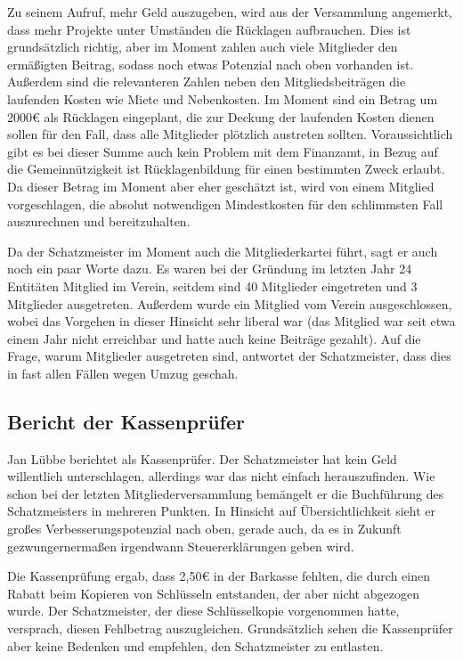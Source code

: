 \documentclass[a4paper,12pt]{scrartcl}
\begin{document}
Zu seinem Aufruf, mehr Geld auszugeben, wird aus der Versammlung angemerkt,
dass mehr Projekte unter Umständen die Rücklagen aufbrauchen. Dies ist
grundsätzlich richtig, aber im Moment zahlen auch viele Mitglieder den
ermäßigten Beitrag, sodass noch etwas Potenzial nach oben vorhanden ist.
Außerdem sind die relevanteren Zahlen neben den Mitgliedsbeiträgen die laufenden
Kosten wie Miete und Nebenkosten. Im Moment sind ein Betrag um 2000€ als
Rücklagen eingeplant, die zur Deckung der laufenden Kosten dienen sollen für den
Fall, dass alle Mitglieder plötzlich austreten sollten. Voraussichtlich gibt es
bei dieser Summe auch kein Problem mit dem Finanzamt, in Bezug auf die
Gemeinnützigkeit ist Rücklagenbildung für einen bestimmten Zweck erlaubt. Da
dieser Betrag im Moment aber eher geschätzt ist, wird von einem Mitglied
vorgeschlagen, die absolut notwendigen Mindestkosten für den schlimmsten Fall
auszurechnen und bereitzuhalten.

Da der Schatzmeister im Moment auch die Mitgliederkartei führt, sagt er auch
noch ein paar Worte dazu. Es waren bei der Gründung im letzten Jahr 24
Entitäten Mitglied im Verein, seitdem sind 40 Mitglieder eingetreten und 3
Mitglieder ausgetreten. Außerdem wurde ein Mitglied vom Verein ausgeschlossen,
wobei das Vorgehen in dieser Hinsicht sehr liberal war (das Mitglied war seit
etwa einem Jahr nicht erreichbar und hatte auch keine Beiträge gezahlt). Auf die
Frage, warum Mitglieder ausgetreten sind, antwortet der Schatzmeister, dass dies
in fast allen Fällen wegen Umzug geschah.

\subsection{Bericht der Kassenprüfer}
Jan Lübbe berichtet als Kassenprüfer. Der Schatzmeister hat kein Geld
willentlich unterschlagen, allerdings war das nicht einfach herauszufinden. Wie
schon bei der letzten Mitgliederversammlung bemängelt er die Buchführung des
Schatzmeisters in mehreren Punkten. In Hinsicht auf Übersichtlichkeit sieht er
großes Verbesserungspotenzial nach oben, gerade auch, da es in Zukunft
gezwungernermaßen irgendwann Steuererklärungen geben wird.

Die Kassenprüfung ergab, dass 2{,}50€ in der Barkasse fehlten, die durch einen
Rabatt beim Kopieren von Schlüsseln entstanden, der aber nicht abgezogen wurde.
Der Schatzmeister, der diese Schlüsselkopie vorgenommen hatte, versprach, diesen
Fehlbetrag auszugleichen. Grundsätzlich sehen die Kassenprüfer aber keine
Bedenken und empfehlen, den Schatzmeister zu entlasten.
\end{document}
